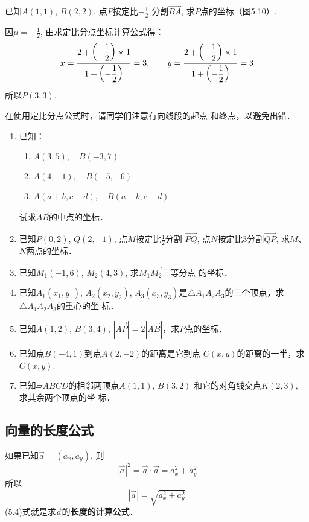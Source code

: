 \begin{example}
    已知$A(1,1)$, $B(2,2)$, 点$P$按定比$-\frac{1}{2}$
分割$\Vec{BA}$, 求$P$点的坐标（图5.10）.
\end{example}

\begin{solution}
因$\mu=-\frac{1}{2}$, 由求定比分点坐标计算公式得：
\[
    x=\dfrac{2+\left(-\dfrac{1}{2}\right)\times 1}{1+\left(-\dfrac{1}{2}\right)}=3,\qquad
    y=\dfrac{2+\left(-\dfrac{1}{2}\right)\times 1}{1+\left(-\dfrac{1}{2}\right)}=3
\]
所以$P(3,3)$.
\end{solution}

在使用定比分点公式时，请同学们注意有向线段的起点
和终点，以避免出错．

\begin{ex}
\begin{enumerate}
    \item 已知：
\begin{enumerate}
    \item $A(3,5),\quad B(-3,7)$
    \item $A(4,-1),\quad B(-5,-6)$
    \item $A(a+b,c+d),\quad B(a-b,c-d)$
\end{enumerate}
    试求$\Vec{AB}$的中点的坐标．
    \item 已知$P(0,2)$, $Q(2,-1)$, 点$M$按定比$\frac{1}{2}$分割
    $\Vec{PQ}$, 点$N$按定比3分割$\Vec{QP}$, 求$M$、$N$两点的坐标．
    \item 已知$M_1(-1,6)$, $M_2(4,3)$, 求$\Vec{M_1M_2}$三等分点
    的坐标．
    \item 已知$A_1(x_1,y_1)$, $A_2(x_2,y_2)$, $A_3(x_3,y_3)$是$\triangle A_1A_2A_3$的三个顶点，求$\triangle A_1A_2A_3$的重心的坐
    标．
    \item 已知$A(1,2)$, $B(3,4)$, 
    $|\Vec{AP}|=2|\Vec{AB}|$，求$P$点的坐标．
    \item 已知点$B(-4,1)$到点$A(2,-2)$的距离是它到点
    $C(x,y)$的距离的一半，求$C(x,y)$.
    \item 已知$\parallelogram{ABCD}$的相邻两顶点$A(1,1)$, $B(3,2)$
    和它的对角线交点$K(2,3)$, 求其余两个顶点的坐
    标．
\end{enumerate}
\end{ex}

\subsection{向量的长度公式}
如果已知$\vec{a}=(a_x,a_y)$, 则
\[|\vec{a}|^2=\vec{a}\cdot \vec{a}=a_x^2+a^2_y\]
所以
\begin{equation}
    |\vec{a}|=\sqrt{a_x^2+a^2_y}
\end{equation}
(5.4)式就是求$\vec{a}$的\textbf{长度的计算公式}．

